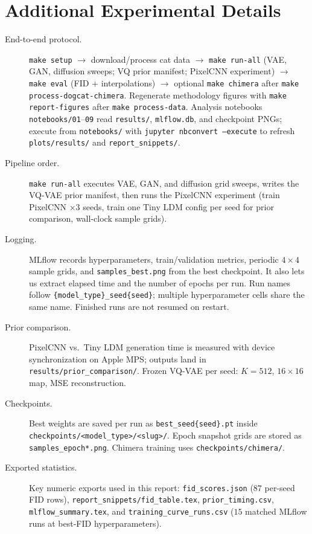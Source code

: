 \documentclass[cameraready]{Interspeech}
\begin{document}
\section{Additional Experimental Details}
\begin{description}
  \item[End-to-end protocol.] \texttt{make setup} $\rightarrow$ download/process cat data $\rightarrow$ \texttt{make run-all} (VAE, GAN, diffusion sweeps; VQ prior manifest; PixelCNN experiment) $\rightarrow$ \texttt{make eval} (FID + interpolations) $\rightarrow$ optional \texttt{make chimera} after \texttt{make process-dogcat-chimera}. Regenerate methodology figures with \texttt{make report-figures} after \texttt{make process-data}. Analysis notebooks \texttt{notebooks/01}--\texttt{09} read \texttt{results/}, \texttt{mlflow.db}, and checkpoint PNGs; execute from \texttt{notebooks/} with \texttt{jupyter nbconvert --execute} to refresh \texttt{plots/results/} and \texttt{report\_snippets/}.

  \item[Pipeline order.] \texttt{make run-all} executes VAE, GAN, and diffusion grid sweeps, writes the VQ-VAE prior manifest, then runs the PixelCNN experiment (train PixelCNN $\times$3 seeds, train one Tiny LDM config per seed for prior comparison, wall-clock sample grids).

  \item[Logging.] MLflow records hyperparameters, train/validation metrics, periodic $4 \times 4$ sample grids, and \texttt{samples\_best.png} from the best checkpoint. It also lets us extract elapsed time and the number of epochs per run. Run names follow \texttt{\{model\_type\}\_seed\{seed\}}; multiple hyperparameter cells share the same name. Finished runs are not resumed on restart.

  \item[Prior comparison.] PixelCNN vs.\ Tiny LDM generation time is measured with device synchronization on Apple MPS; outputs land in \texttt{results/prior\_comparison/}. Frozen VQ-VAE per seed: $K{=}512$, $16{\times}16$ map, MSE reconstruction.

  \item[Checkpoints.] Best weights are saved per run as \texttt{best\_seed\{seed\}.pt} inside \texttt{checkpoints/<model\_type>/<slug>/}. Epoch snapshot grids are stored as \texttt{samples\_epoch*.png}. Chimera training uses \texttt{checkpoints/chimera/}.

  \item[Exported statistics.] Key numeric exports used in this report: \texttt{fid\_scores.json} ($87$ per-seed FID rows), \texttt{report\_snippets/fid\_table.tex}, \texttt{prior\_timing.csv}, \texttt{mlflow\_summary.tex}, and \texttt{training\_curve\_runs.csv} ($15$ matched MLflow runs at best-FID hyperparameters).
\end{description}
\end{document}
